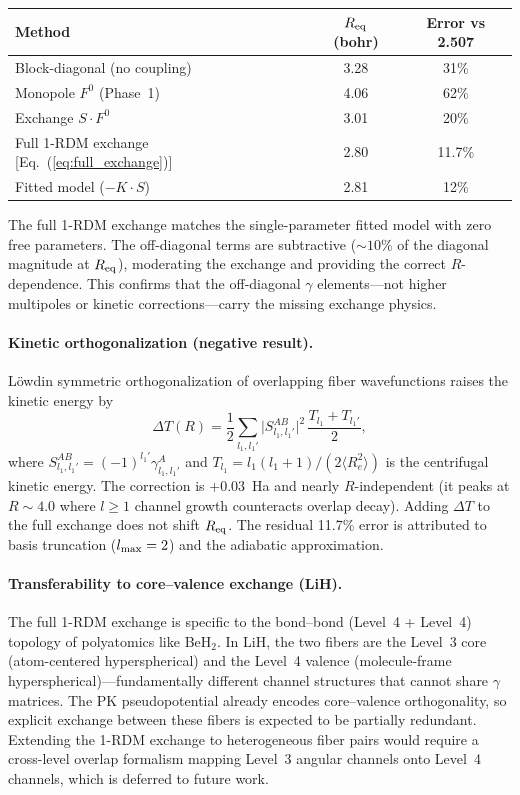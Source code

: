 \documentclass[aps,pra,twocolumn,superscriptaddress,longbibliography,floatfix]{revtex4-2}
\begin{document}
\begin{center}
\begin{tabular}{lcc}
\hline
Method & $R_{\rm eq}$ (bohr) & Error vs 2.507 \\
\hline
Block-diagonal (no coupling) & 3.28 & 31\% \\
Monopole $F^0$ (Phase~1)     & 4.06 & 62\% \\
Exchange $S \cdot F^0$       & 3.01 & 20\% \\
Full 1-RDM exchange [Eq.~(\ref{eq:full_exchange})] & 2.80 & 11.7\% \\
Fitted model ($-K \cdot S$)  & 2.81 & 12\% \\
\hline
\end{tabular}
\end{center}

The full 1-RDM exchange matches the single-parameter fitted model
with zero free parameters.  The off-diagonal terms are subtractive
(${\sim}10\%$ of the diagonal magnitude at $R_{\rm eq}$),
moderating the exchange and providing the correct $R$-dependence.
This confirms that the off-diagonal $\gamma$ elements---not
higher multipoles or kinetic corrections---carry the missing
exchange physics.

\paragraph{Kinetic orthogonalization (negative result).}
L\"{o}wdin symmetric orthogonalization of overlapping fiber
wavefunctions raises the kinetic energy by
\begin{equation}
  \Delta T(R) = \frac{1}{2} \sum_{l_1, l_1'}
    \bigl|S^{AB}_{l_1, l_1'}\bigr|^2\,
    \frac{T_{l_1} + T_{l_1'}}{2},
\end{equation}
where $S^{AB}_{l_1, l_1'} = (-1)^{l_1'} \gamma^A_{l_1, l_1'}$
and $T_{l_1} = l_1(l_1+1)/(2\langle R_e^2 \rangle)$ is the
centrifugal kinetic energy.  The correction is $+0.03$~Ha and
nearly $R$-independent (it peaks at $R \sim 4.0$ where $l \ge 1$
channel growth counteracts overlap decay).  Adding $\Delta T$ to
the full exchange does not shift $R_{\rm eq}$.  The residual
11.7\% error is attributed to basis truncation ($l_{\rm max} = 2$)
and the adiabatic approximation.

\paragraph{Transferability to core--valence exchange (LiH).}
The full 1-RDM exchange is specific to the bond--bond (Level~4 +
Level~4) topology of polyatomics like BeH$_2$.  In LiH, the two
fibers are the Level~3 core (atom-centered hyperspherical) and
the Level~4 valence (molecule-frame hyperspherical)---fundamentally
different channel structures that cannot share $\gamma$ matrices.
The PK pseudopotential already encodes core--valence orthogonality,
so explicit exchange between these fibers is expected to be
partially redundant.  Extending the 1-RDM exchange to heterogeneous
fiber pairs would require a cross-level overlap formalism mapping
Level~3 angular channels onto Level~4 channels, which is deferred
to future work.
\end{document}

